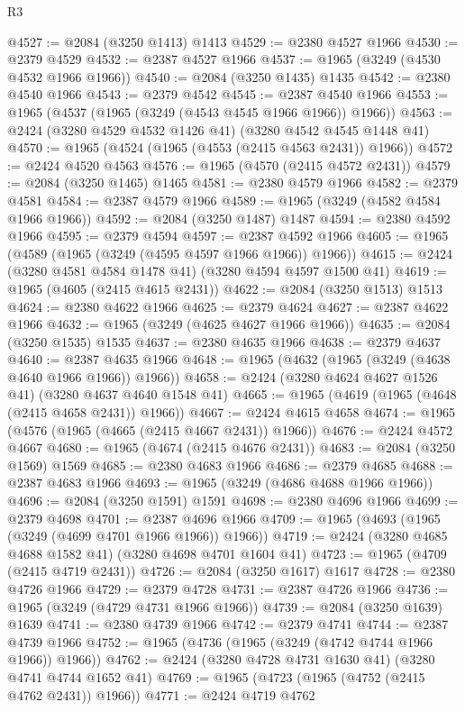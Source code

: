 \begin{lexlean}{R3}
\begin{coremodule}
@4527 := @2084 (@3250 @1413) @1413
@4529 := @2380 @4527 @1966
@4530 := @2379 @4529
@4532 := @2387 @4527 @1966
@4537 := @1965 (@3249 (@4530 @4532 @1966 @1966))
@4540 := @2084 (@3250 @1435) @1435
@4542 := @2380 @4540 @1966
@4543 := @2379 @4542
@4545 := @2387 @4540 @1966
@4553 := @1965 (@4537 (@1965 (@3249 (@4543 @4545 @1966 @1966)) @1966))
@4563 := @2424 (@3280 @4529 @4532 @1426 @41) (@3280 @4542 @4545 @1448 @41)
@4570 := @1965 (@4524 (@1965 (@4553 (@2415 @4563 @2431)) @1966))
@4572 := @2424 @4520 @4563
@4576 := @1965 (@4570 (@2415 @4572 @2431))
@4579 := @2084 (@3250 @1465) @1465
@4581 := @2380 @4579 @1966
@4582 := @2379 @4581
@4584 := @2387 @4579 @1966
@4589 := @1965 (@3249 (@4582 @4584 @1966 @1966))
@4592 := @2084 (@3250 @1487) @1487
@4594 := @2380 @4592 @1966
@4595 := @2379 @4594
@4597 := @2387 @4592 @1966
@4605 := @1965 (@4589 (@1965 (@3249 (@4595 @4597 @1966 @1966)) @1966))
@4615 := @2424 (@3280 @4581 @4584 @1478 @41) (@3280 @4594 @4597 @1500 @41)
@4619 := @1965 (@4605 (@2415 @4615 @2431))
@4622 := @2084 (@3250 @1513) @1513
@4624 := @2380 @4622 @1966
@4625 := @2379 @4624
@4627 := @2387 @4622 @1966
@4632 := @1965 (@3249 (@4625 @4627 @1966 @1966))
@4635 := @2084 (@3250 @1535) @1535
@4637 := @2380 @4635 @1966
@4638 := @2379 @4637
@4640 := @2387 @4635 @1966
@4648 := @1965 (@4632 (@1965 (@3249 (@4638 @4640 @1966 @1966)) @1966))
@4658 := @2424 (@3280 @4624 @4627 @1526 @41) (@3280 @4637 @4640 @1548 @41)
@4665 := @1965 (@4619 (@1965 (@4648 (@2415 @4658 @2431)) @1966))
@4667 := @2424 @4615 @4658
@4674 := @1965 (@4576 (@1965 (@4665 (@2415 @4667 @2431)) @1966))
@4676 := @2424 @4572 @4667
@4680 := @1965 (@4674 (@2415 @4676 @2431))
@4683 := @2084 (@3250 @1569) @1569
@4685 := @2380 @4683 @1966
@4686 := @2379 @4685
@4688 := @2387 @4683 @1966
@4693 := @1965 (@3249 (@4686 @4688 @1966 @1966))
@4696 := @2084 (@3250 @1591) @1591
@4698 := @2380 @4696 @1966
@4699 := @2379 @4698
@4701 := @2387 @4696 @1966
@4709 := @1965 (@4693 (@1965 (@3249 (@4699 @4701 @1966 @1966)) @1966))
@4719 := @2424 (@3280 @4685 @4688 @1582 @41) (@3280 @4698 @4701 @1604 @41)
@4723 := @1965 (@4709 (@2415 @4719 @2431))
@4726 := @2084 (@3250 @1617) @1617
@4728 := @2380 @4726 @1966
@4729 := @2379 @4728
@4731 := @2387 @4726 @1966
@4736 := @1965 (@3249 (@4729 @4731 @1966 @1966))
@4739 := @2084 (@3250 @1639) @1639
@4741 := @2380 @4739 @1966
@4742 := @2379 @4741
@4744 := @2387 @4739 @1966
@4752 := @1965 (@4736 (@1965 (@3249 (@4742 @4744 @1966 @1966)) @1966))
@4762 := @2424 (@3280 @4728 @4731 @1630 @41) (@3280 @4741 @4744 @1652 @41)
@4769 := @1965 (@4723 (@1965 (@4752 (@2415 @4762 @2431)) @1966))
@4771 := @2424 @4719 @4762

\end{coremodule}
\end{lexlean}
